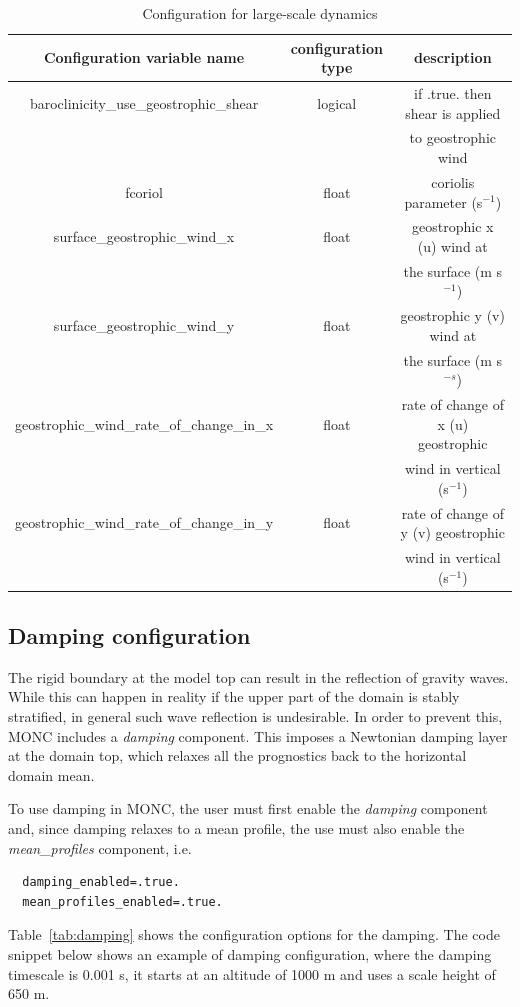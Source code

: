 \documentclass[a4paper,11pt]{article}
\begin{document}
\begin{table}[H]
\protect\caption{Configuration for large-scale dynamics}
\label{tab:ls_dynamics}
\begin{tabular}{|c|c|c|}
\hline
Configuration variable name & configuration type & description\tabularnewline
\hline
\hline
baroclinicity\_use\_geostrophic\_shear & logical & if .true. then shear is applied \tabularnewline
  &  &  to geostrophic wind \tabularnewline
\hline
fcoriol  &  float & coriolis parameter (s$^{-1}$) \tabularnewline
\hline
surface\_geostrophic\_wind\_x & float & geostrophic x (u) wind at \tabularnewline
 &  & the surface (m s$^{-1}$) \tabularnewline
\hline
surface\_geostrophic\_wind\_y & float & geostrophic y (v) wind at \tabularnewline
 &  & the surface (m s$^{-s}$) \tabularnewline
\hline
geostrophic\_wind\_rate\_of\_change\_in\_x & float & rate of change of x (u) geostrophic \tabularnewline
  &  & wind in vertical (s$^{-1}$)\tabularnewline
\hline
geostrophic\_wind\_rate\_of\_change\_in\_y & float & rate of change of y (v) geostrophic \tabularnewline
  &  & wind in vertical (s$^{-1}$)\tabularnewline
\hline
\hline
\end{tabular}
\end{table}

\subsection{Damping configuration}

The rigid boundary at the model top can result in the reflection of gravity waves.
While this can happen in reality if the upper part of the domain is stably stratified,
in general such wave reflection is undesirable. In order to prevent this,
MONC includes a \emph{damping} component. This imposes a Newtonian damping layer at
the domain top, which relaxes all the prognostics back to the horizontal domain mean.

To use damping in MONC, the user must first enable the \emph{damping} component and, since
damping relaxes to a mean profile, the use must also enable the \emph{mean\_profiles}
component, i.e.

\begin{lstlisting}
  damping_enabled=.true.
  mean_profiles_enabled=.true.
\end{lstlisting}

Table~\ref{tab:damping} shows the configuration options for the damping. The code snippet
below shows an example of damping configuration, where the damping timescale
is 0.001 s, it starts at an altitude of 1000 m and uses a scale height of
650 m.
\end{document}
